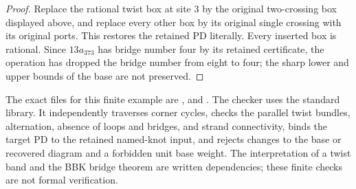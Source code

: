 \documentclass[11pt]{article}
\begin{document}
\begin{proof}
Replace the rational twist box at site $3$ by the original two-crossing
box displayed above, and replace every other box by its original
single crossing with its original ports. This restores the retained
PD literally. Every inserted box is rational. Since $13a_{373}$ has
bridge number four by its retained certificate, the operation has
dropped the bridge number from eight to four; the sharp lower and
upper bounds of the base are not preserved.
\end{proof}

The exact files for this finite example are
,
 and
.
The checker uses the standard library. It independently traverses
corner cycles, checks the parallel twist bundles, alternation, absence of loops and bridges, and strand connectivity, binds
the target PD to the retained named-knot input, and rejects changes
to the base or recovered diagram and a forbidden unit base weight.
The interpretation of a twist band and the BBK bridge theorem are
written dependencies; these finite checks are not formal verification.
\end{document}
